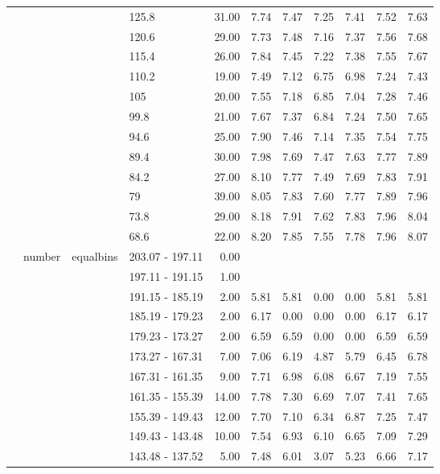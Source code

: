 \begin{longtable}{llllrrrrrrr}
   &  &  & 125.8 & 31.00 & 7.74 & 7.47 & 7.25 & 7.41 & 7.52 & 7.63 \\ 
   &  &  & 120.6 & 29.00 & 7.73 & 7.48 & 7.16 & 7.37 & 7.56 & 7.68 \\ 
   &  &  & 115.4 & 26.00 & 7.84 & 7.45 & 7.22 & 7.38 & 7.55 & 7.67 \\ 
   &  &  & 110.2 & 19.00 & 7.49 & 7.12 & 6.75 & 6.98 & 7.24 & 7.43 \\ 
   &  &  & 105 & 20.00 & 7.55 & 7.18 & 6.85 & 7.04 & 7.28 & 7.46 \\ 
   &  &  & 99.8 & 21.00 & 7.67 & 7.37 & 6.84 & 7.24 & 7.50 & 7.65 \\ 
   &  &  & 94.6 & 25.00 & 7.90 & 7.46 & 7.14 & 7.35 & 7.54 & 7.75 \\ 
   &  &  & 89.4 & 30.00 & 7.98 & 7.69 & 7.47 & 7.63 & 7.77 & 7.89 \\ 
   &  &  & 84.2 & 27.00 & 8.10 & 7.77 & 7.49 & 7.69 & 7.83 & 7.91 \\ 
   &  &  & 79 & 39.00 & 8.05 & 7.83 & 7.60 & 7.77 & 7.89 & 7.96 \\ 
   &  &  & 73.8 & 29.00 & 8.18 & 7.91 & 7.62 & 7.83 & 7.96 & 8.04 \\ 
   &  &  & 68.6 & 22.00 & 8.20 & 7.85 & 7.55 & 7.78 & 7.96 & 8.07 \\ 
   & number & equalbins & 203.07 - 197.11 & 0.00 &  &  &  &  &  &  \\ 
   &  &  & 197.11 - 191.15 & 1.00 &  &  &  &  &  &  \\ 
   &  &  & 191.15 - 185.19 & 2.00 & 5.81 & 5.81 & 0.00 & 0.00 & 5.81 & 5.81 \\ 
   &  &  & 185.19 - 179.23 & 2.00 & 6.17 & 0.00 & 0.00 & 0.00 & 6.17 & 6.17 \\ 
   &  &  & 179.23 - 173.27 & 2.00 & 6.59 & 6.59 & 0.00 & 0.00 & 6.59 & 6.59 \\ 
   &  &  & 173.27 - 167.31 & 7.00 & 7.06 & 6.19 & 4.87 & 5.79 & 6.45 & 6.78 \\ 
   &  &  & 167.31 - 161.35 & 9.00 & 7.71 & 6.98 & 6.08 & 6.67 & 7.19 & 7.55 \\ 
   &  &  & 161.35 - 155.39 & 14.00 & 7.78 & 7.30 & 6.69 & 7.07 & 7.41 & 7.65 \\ 
   &  &  & 155.39 - 149.43 & 12.00 & 7.70 & 7.10 & 6.34 & 6.87 & 7.25 & 7.47 \\ 
   &  &  & 149.43 - 143.48 & 10.00 & 7.54 & 6.93 & 6.10 & 6.65 & 7.09 & 7.29 \\ 
   &  &  & 143.48 - 137.52 & 5.00 & 7.48 & 6.01 & 3.07 & 5.23 & 6.66 & 7.17 \\ 

\end{longtable}
